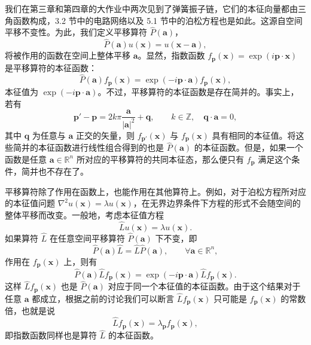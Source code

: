 我们在第三章和第四章的大作业中两次见到了弹簧振子链，它们的本征向量都由三角函数构成，3.2 节中的电路网络以及 5.1 节中的泊松方程也是如此。这源自空间平移不变性。为此，我们定义平移算符 $\hat P(\bm a)$，
\begin{equation}
\hat P(\bm a)u(\bm x)=u(\bm x-\bm a),
\tag{5.2.1}
\end{equation}
将被作用的函数在空间上整体平移 $\bm a$。显然，指数函数 $f_{\bm p}(\bm x)=\exp(i\bm p\cdot\bm x)$ 是平移算符的本征函数：
\begin{equation}
\hat P(\bm a)f_{\bm p}(\bm x)=\exp(-i\bm p\cdot\bm a)f_{\bm p}(\bm x),
\tag{5.2.2}
\end{equation}
本征值为 $\exp(-i\bm p\cdot\bm a)$。不过，平移算符的本征函数是存在简并的。事实上，若有
\[
\bm p'-\bm p=2k\pi\frac{\bm a}{|\bm a|^2}+\bm q,
\qquad k\in\mathbb Z,\quad \bm q\cdot\bm a=0,
\]
其中 $\bm q$ 为任意与 $\bm a$ 正交的矢量，则 $f_{\bm p'}(\bm x)$ 与 $f_{\bm p}(\bm x)$ 具有相同的本征值。将这些简并的本征函数进行线性组合得到的也是 $\hat P(\bm a)$ 的本征函数。但是，如果一个函数是任意 $\bm a\in\mathbb R^n$ 所对应的平移算符的共同本征态，那么便只有 $f_{\bm p}$ 满足这个条件，简并也不存在了。

平移算符除了作用在函数上，也能作用在其他算符上。例如，对于泊松方程所对应的本征值问题 $\nabla^2u(\bm x)=\lambda u(\bm x)$，在无界边界条件下方程的形式不会随空间的整体平移而改变。一般地，考虑本征值方程
\begin{equation}
\hat L u(\bm x)=\lambda u(\bm x).
\tag{5.2.3}
\end{equation}
如果算符 $\hat L$ 在任意空间平移算符 $\hat P(\bm a)$ 下不变，即
\begin{equation}
\hat P(\bm a)\hat L=\hat L\hat P(\bm a),\qquad \forall\bm a\in\mathbb R^n,
\tag{5.2.4}
\end{equation}
作用在 $f_{\bm p}(\bm x)$ 上，则有
\begin{equation}
\hat P(\bm a)\hat Lf_{\bm p}(\bm x)
=\exp(-i\bm p\cdot\bm a)\hat Lf_{\bm p}(\bm x).
\tag{5.2.5}
\end{equation}
这样 $\hat Lf_{\bm p}(\bm x)$ 也是 $\hat P(\bm a)$ 对应于同一个本征值的本征函数。由于这个结果对于任意 $\bm a$ 都成立，根据之前的讨论我们可以断言 $\hat Lf_{\bm p}(\bm x)$ 只可能是 $f_{\bm p}(\bm x)$ 的常数倍，也就是说
\begin{equation}
\hat Lf_{\bm p}(\bm x)=\lambda_{\bm p}f_{\bm p}(\bm x),
\tag{5.2.6}
\end{equation}
即指数函数同样也是算符 $\hat L$ 的本征函数。

